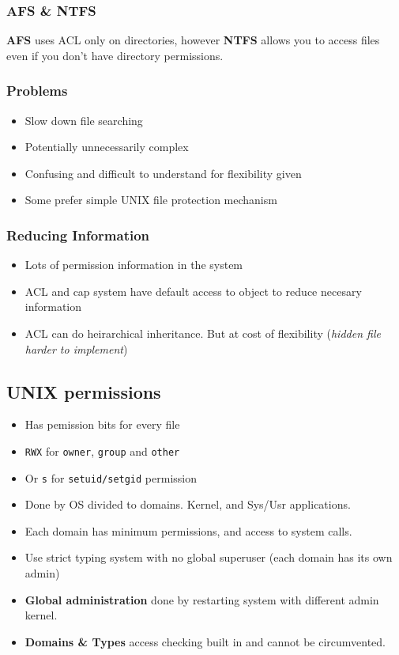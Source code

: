 \documentclass{article}
\begin{document}
		\subsubsection{AFS \& NTFS}
			\textbf{AFS} uses ACL only on directories, however \textbf{NTFS} allows you to access files even if you don't have directory permissions.
			
		\subsubsection{Problems}
			\begin{itemize}
				\item Slow down file searching
				\item Potentially unnecessarily complex
				\item Confusing and difficult to understand for flexibility given
				\item Some prefer simple UNIX file protection mechanism
			\end{itemize}
			
		\subsubsection{Reducing Information}
			\begin{itemize}
				\item Lots of permission information in the system
				\item ACL and cap system have default access to object to reduce necesary information
				\item ACL can do heirarchical inheritance. But at cost of flexibility (\textit{hidden file harder to implement})
			\end{itemize}
			
	\subsection{UNIX permissions}
		\begin{itemize}
			\item Has pemission bits for every file
			\item \texttt{RWX} for \texttt{owner}, \texttt{group} and \texttt{other}
			\item Or \texttt{s} for \texttt{setuid/setgid} permission\\
			\item Done by OS divided to domains. Kernel, and Sys/Usr applications.
			\item Each domain has minimum permissions, and access to system calls.
			\item Use strict typing system with no global superuser (each domain has its own admin)
			\item \textbf{Global administration} done by restarting system with different admin kernel.\\
			\item \textbf{Domains \& Types} access checking built in and cannot be circumvented.
		\end{itemize}
		
\end{document}
